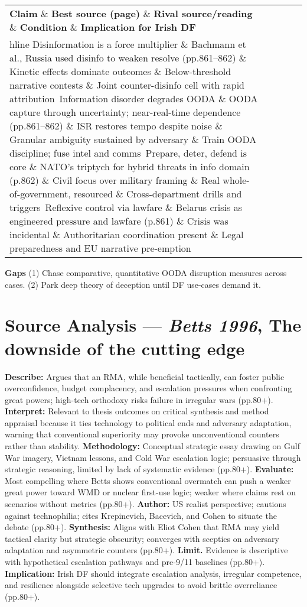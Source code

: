  
\begin{tabular}{p{3.2cm}p{4.2cm}p{3.6cm}p{3.2cm}p{4.2cm}}
	\textbf{Claim} \& \textbf{Best source (page)} \& \textbf{Rival source/reading} \& \textbf{Condition} \& \textbf{Implication for Irish DF}\\hline
	Disinformation is a force multiplier \& Bachmann et al., Russia used disinfo to weaken resolve (pp.861–862) \& Kinetic effects dominate outcomes \& Below-threshold narrative contests \& Joint counter-disinfo cell with rapid attribution\
	Information disorder degrades OODA \& OODA capture through uncertainty; near-real-time dependence (pp.861–862) \& ISR restores tempo despite noise \& Granular ambiguity sustained by adversary \& Train OODA discipline; fuse intel and comms\
	Prepare, deter, defend is core \& NATO’s triptych for hybrid threats in info domain (p.862) \& Civil focus over military framing \& Real whole-of-government, resourced \& Cross-department drills and triggers\
	Reflexive control via lawfare \& Belarus crisis as engineered pressure and lawfare (p.861) \& Crisis was incidental \& Authoritarian coordination present \& Legal preparedness and EU narrative pre-emption\
\end{tabular}

\textbf{Gaps}
(1) Chase comparative, quantitative OODA disruption measures across cases.
(2) Park deep theory of deception until DF use-cases demand it.

\parencite{BETTS_1996}

\section*{Source Analysis — \textit{Betts 1996}, The downside of the cutting edge}
\textbf{Describe:} Argues that an RMA, while beneficial tactically, can foster public overconfidence, budget complacency, and escalation pressures when confronting great powers; high-tech orthodoxy risks failure in irregular wars (pp.80+).
\textbf{Interpret:} Relevant to thesis outcomes on critical synthesis and method appraisal because it ties technology to political ends and adversary adaptation, warning that conventional superiority may provoke unconventional counters rather than stability.
\textbf{Methodology:} Conceptual strategic essay drawing on Gulf War imagery, Vietnam lessons, and Cold War escalation logic; persuasive through strategic reasoning, limited by lack of systematic evidence (pp.80+).
\textbf{Evaluate:} Most compelling where Betts shows conventional overmatch can push a weaker great power toward WMD or nuclear first-use logic; weaker where claims rest on scenarios without metrics (pp.80+).
\textbf{Author:} US realist perspective; cautions against technophilia; cites Krepinevich, Bacevich, and Cohen to situate the debate (pp.80+).
\textbf{Synthesis:} Aligns with Eliot Cohen that RMA may yield tactical clarity but strategic obscurity; converges with sceptics on adversary adaptation and asymmetric counters (pp.80+).
\textbf{Limit.} Evidence is descriptive with hypothetical escalation pathways and pre-9/11 baselines (pp.80+).
\textbf{Implication:} Irish DF should integrate escalation analysis, irregular competence, and resilience alongside selective tech upgrades to avoid brittle overreliance (pp.80+).

